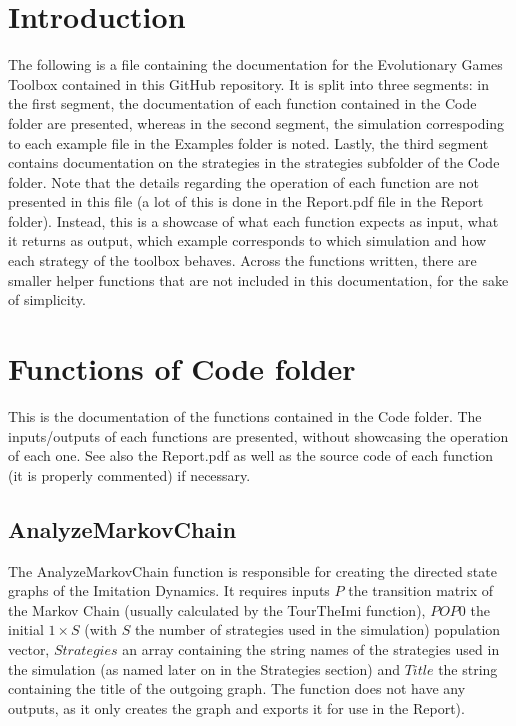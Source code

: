 \section{Introduction}
The following is a file containing the documentation for the Evolutionary Games Toolbox contained in this GitHub repository. It is split into three segments: in the first segment, the documentation of each function contained in the Code folder are presented, whereas in the second segment, the simulation correspoding to each example file in the Examples folder is noted. Lastly, the third segment contains documentation on the strategies in the strategies subfolder of the Code folder. Note that the details regarding the operation of each function are not presented in this file (a lot of this is done in the Report.pdf file in the Report folder). Instead, this is a showcase of what each function expects as input, what it returns as output, which example corresponds to which simulation and how each strategy of the toolbox behaves. Across the functions written, there are smaller helper functions that are not included in this documentation, for the sake of simplicity.

\section{Functions of Code folder}
This is the documentation of the functions contained in the Code folder. The inputs/outputs of each functions are presented, without showcasing the operation of each one. See also the Report.pdf as well as the source code of each function (it is properly commented) if necessary.

\subsection{AnalyzeMarkovChain}
The AnalyzeMarkovChain function is responsible for creating the directed state graphs of the Imitation Dynamics. It requires inputs $P$ the transition matrix of the Markov Chain (usually calculated by the TourTheImi function), $POP0$ the initial $1 \times S$ (with $S$ the number of strategies used in the simulation) population vector, $Strategies$ an array containing the string names of the strategies used in the simulation (as named later on in the Strategies section) and $Title$ the string containing the title of the outgoing graph. The function does not have any outputs, as it only creates the graph and exports it for use in the Report).

